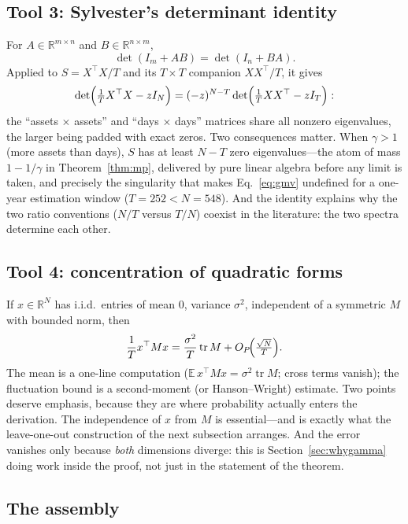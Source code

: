 \documentclass[11pt]{article}
\newcommand{\tr}{\operatorname{tr}}
\begin{document}
\subsection{Tool 3: Sylvester's determinant identity}

For $A\in\mathbb R^{m\times n}$ and $B\in\mathbb R^{n\times m}$,
\begin{equation}
\det(I_m+AB)=\det(I_n+BA).
\label{eq:sylvester}
\end{equation}
Applied to $S=X^{\top}X/T$ and its $T\times T$ companion $XX^{\top}/T$, it
gives
\[
\det\Bigl(\tfrac1T X^{\top}X-zI_N\Bigr)
=(-z)^{N-T}\det\Bigl(\tfrac1T XX^{\top}-zI_T\Bigr):
\]
the ``assets $\times$ assets'' and ``days $\times$ days'' matrices share
all nonzero eigenvalues, the larger being padded with exact zeros. Two
consequences matter. When $\gamma>1$ (more assets than days), $S$ has at
least $N-T$ zero eigenvalues---the atom of mass $1-1/\gamma$ in
Theorem~\ref{thm:mp}, delivered by pure linear algebra before any limit is
taken, and precisely the singularity that makes Eq.~\eqref{eq:gmv}
undefined for a one-year estimation window ($T=252<N=548$). And the
identity explains why the two ratio conventions ($N/T$ versus $T/N$)
coexist in the literature: the two spectra determine each other.

\subsection{Tool 4: concentration of quadratic forms}

If $x\in\mathbb R^{N}$ has i.i.d.\ entries of mean $0$, variance
$\sigma^{2}$, independent of a symmetric $M$ with bounded norm, then
\begin{equation}
\frac1T x^{\top}Mx=\frac{\sigma^{2}}{T}\tr M
+O_{P}\!\Bigl(\tfrac{\sqrt N}{T}\Bigr).
\label{eq:conc}
\end{equation}
The mean is a one-line computation
($\mathbb E\,x^{\top}Mx=\sigma^{2}\tr M$; cross terms vanish); the
fluctuation bound is a second-moment (or Hanson--Wright) estimate. Two
points deserve emphasis, because they are where probability actually enters
the derivation. The independence of $x$ from $M$ is essential---and is
exactly what the leave-one-out construction of the next subsection
arranges. And the error vanishes only because \emph{both} dimensions
diverge: this is Section~\ref{sec:whygamma} doing work inside the proof,
not just in the statement of the theorem.

\subsection{The assembly}
\end{document}
